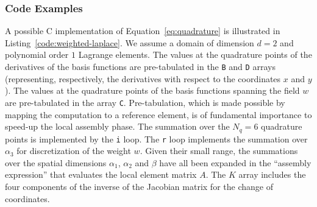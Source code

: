 \subsubsection{Code Examples}
\label{sec:bkg:mathcode}
A possible C implementation of Equation~\ref{eq:quadrature} is illustrated in Listing~\ref{code:weighted-laplace}. We assume a domain of dimension $d=2$ and polynomial order $1$ Lagrange elements. The values at the quadrature points of the derivatives of the basis functions are pre-tabulated in the \texttt{B} and \texttt{D} arrays (representing, respectively, the derivatives with respect to the coordinates $x$ and $y$). The values at the quadrature points of the basis functions spanning the field $w$ are pre-tabulated in the array \texttt{C}. Pre-tabulation, which is made possible by mapping the computation to a reference element, is of fundamental importance to speed-up the local assembly phase. The summation over the $N_q = 6$ quadrature points is implemented by the \texttt{i} loop. The \texttt{r} loop implements the summation over $\alpha_3$ for discretization of the weight $w$. Given their small range, the summations over the spatial dimensions $\alpha_1$, $\alpha_2$ and $\beta$ have all been expanded in the ``assembly expression'' that evaluates the local element matrix $A$. The $K$ array includes the four components of the inverse of the Jacobian matrix for the change of coordinates. 

